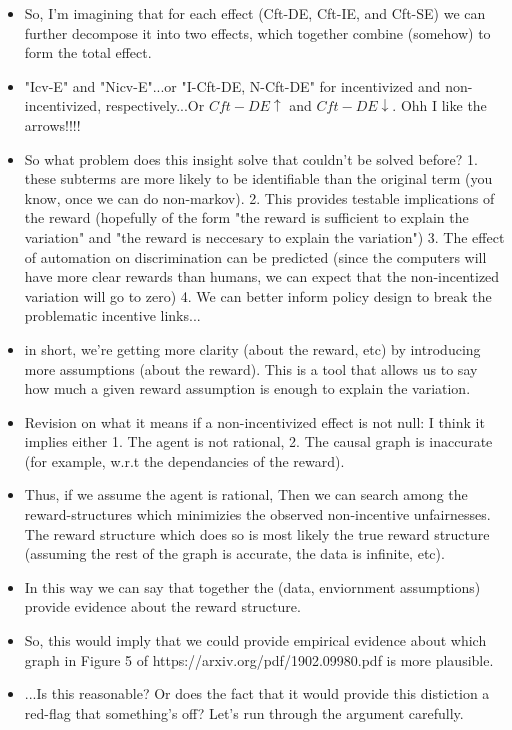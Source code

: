 \documentclass[letterpaper,10pt]{article}
\begin{document}
\begin{itemize}
  \item So, I'm imagining that for each effect (Cft-DE, Cft-IE, and Cft-SE) we can further decompose it into two effects, which together combine (somehow) to form the total effect. 
  \item "Icv-E" and "Nicv-E"...or "I-Cft-DE, N-Cft-DE" for incentivized and non-incentivized, respectively...Or $Cft-DE\uparrow$ and $Cft-DE\downarrow$. Ohh I like the arrows!!!!
  \item So what problem does this insight solve that couldn't be solved before? 1. these subterms are more likely to be identifiable than the original term (you know, once we can do non-markov). 2. This provides testable implications of the reward (hopefully of the form "the reward is sufficient to explain the variation" and "the reward is neccesary to explain the variation") 3. The effect of automation on discrimination can be predicted (since the computers will have more clear rewards than humans, we can expect that the non-incentized variation will go to zero) 4. We can better inform policy design to break the problematic incentive links...
  \item in short, we're getting more clarity (about the reward, etc) by introducing more assumptions (about the reward). This is a tool that allows us to say how much a given reward assumption is enough to explain the variation.
  \item Revision on what it means if a non-incentivized effect is not null: I think it implies either 1. The agent is not rational, 2. The causal graph is inaccurate (for example, w.r.t the dependancies of the reward).
  \item Thus, if we assume the agent is rational, Then we can search among the reward-structures which minimizies the observed non-incentive unfairnesses. The reward structure which does so is most likely the true reward structure (assuming the rest of the graph is accurate, the data is infinite, etc). 
  \item In this way we can say that together the (data, enviornment assumptions) provide evidence about the reward structure.
  \item So, this would imply that we could provide empirical evidence about which graph in Figure 5 of https://arxiv.org/pdf/1902.09980.pdf is more plausible.
  \item ...Is this reasonable? Or does the fact that it would provide this distiction a red-flag that something's off? Let's run through the argument carefully.
  \begin{itemize}

\end{itemize}
\end{itemize}
\end{document}
